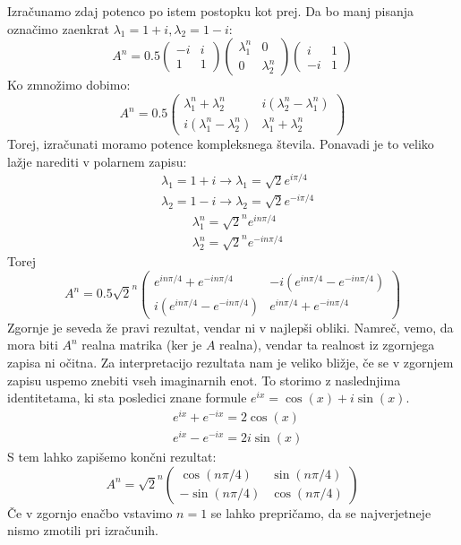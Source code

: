 \documentclass{article}
\begin{document}
\noindent Izračunamo zdaj potenco po istem postopku kot prej. Da bo manj pisanja označimo zaenkrat $\lambda_1 = 1+i, \lambda_2 = 1-i$:
\begin{equation*}
A^n = 0.5
\begin{pmatrix}
-i & i \\
1  & 1
\end{pmatrix}
\begin{pmatrix}
\lambda_1^n & 0 \\
0  & \lambda_2^n
\end{pmatrix}
\begin{pmatrix}
i & 1 \\
-i  & 1
\end{pmatrix}
\end{equation*}
Ko zmnožimo dobimo:
\begin{equation*}
A^n = 0.5
\begin{pmatrix}
\lambda_1^n + \lambda_2^n & i(\lambda_2^n - \lambda_1^n) \\
i(\lambda_1^n - \lambda_2^n)  & \lambda_1^n+\lambda_2^n
\end{pmatrix}
\end{equation*}
Torej, izračunati moramo potence kompleksnega števila. Ponavadi je to veliko lažje narediti v polarnem zapisu:
\begin{align*}
&\lambda_1 = 1+i \to \lambda_1 = \sqrt{2} e^{i \pi/4} \\
&\lambda_2 = 1-i \to \lambda_2 = \sqrt{2} e^{-i \pi/4} 
\end{align*}
\begin{align*}
&\lambda_1^n = \sqrt{2}^n e^{i n \pi/4} \\
&\lambda_2^n = \sqrt{2}^n e^{-i n \pi/4} 
\end{align*}
Torej
\begin{equation*}
A^n = 0.5 \sqrt{2}^n
\begin{pmatrix}
e^{i n \pi/4} + e^{-i n \pi/4} & -i(e^{i n \pi/4} - e^{-i n \pi/4}) \\
i(e^{i n \pi/4} - e^{-i n \pi/4})  &e^{i n \pi/4} + e^{-i n \pi/4}
\end{pmatrix}
\end{equation*}
Zgornje je seveda že pravi rezultat, vendar ni v najlepši obliki. Namreč, vemo, da mora biti $A^n$ realna matrika (ker je $A$ realna), vendar ta realnost iz zgornjega zapisa ni očitna. Za interpretacijo rezultata nam je veliko bližje, če se v zgornjem zapisu uspemo znebiti vseh imaginarnih enot. To storimo z naslednjima identitetama, ki sta posledici znane formule $e^{ix} = \cos(x) + i \sin(x)$. 
\begin{align*}
&e^{ix} + e^{-ix} = 2 \cos(x) \\
&e^{ix} - e^{-ix} = 2i \sin(x)
\end{align*}
S tem lahko zapišemo končni rezultat:
\begin{equation*}
A^n = \sqrt{2}^n
\begin{pmatrix}
\cos(n \pi/4) & \sin(n \pi/4) \\
-\sin(n \pi/4)  & \cos(n \pi/4)
\end{pmatrix}
\end{equation*}
Če v zgornjo enačbo vstavimo $n=1$ se lahko prepričamo, da se najverjetneje nismo zmotili pri izračunih.
\end{document}
